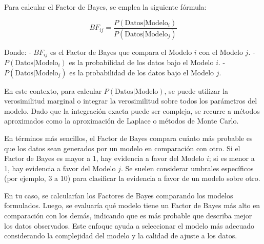 Para calcular el Factor de Bayes, se emplea la siguiente fórmula:

\[ BF_{ij} = \frac{P(\text{Datos}|\text{Modelo}_i)}{P(\text{Datos}|\text{Modelo}_j)} \]

Donde:
- \( BF_{ij} \) es el Factor de Bayes que compara el Modelo \(i\) con el Modelo \(j\).
- \( P(\text{Datos}|\text{Modelo}_i) \) es la probabilidad de los datos bajo el Modelo \(i\).
- \( P(\text{Datos}|\text{Modelo}_j) \) es la probabilidad de los datos bajo el Modelo \(j\).

En este contexto, para calcular \( P(\text{Datos}|\text{Modelo}) \), se puede utilizar la verosimilitud marginal o integrar la verosimilitud sobre todos los parámetros del modelo. Dado que la integración exacta puede ser compleja, se recurre a métodos aproximados como la aproximación de Laplace o métodos de Monte Carlo.

En términos más sencillos, el Factor de Bayes compara cuánto más probable es que los datos sean generados por un modelo en comparación con otro. Si el Factor de Bayes es mayor a 1, hay evidencia a favor del Modelo \(i\); si es menor a 1, hay evidencia a favor del Modelo \(j\). Se suelen considerar umbrales específicos (por ejemplo, 3 a 10) para clasificar la evidencia a favor de un modelo sobre otro.

En tu caso, se calcularían los Factores de Bayes comparando los modelos formulados. Luego, se evaluaría qué modelo tiene un Factor de Bayes más alto en comparación con los demás, indicando que es más probable que describa mejor los datos observados. Este enfoque ayuda a seleccionar el modelo más adecuado considerando la complejidad del modelo y la calidad de ajuste a los datos.



